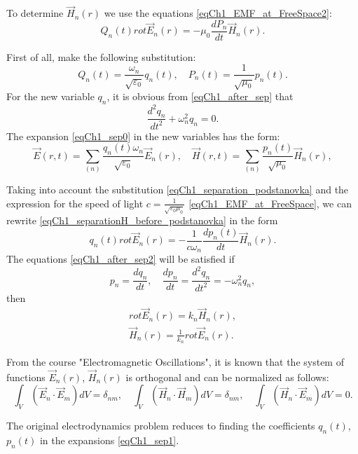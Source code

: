 To determine $\vec{H}_n\left(r\right)$ we use the equations 
\eqref{eqCh1_EMF_at_FreeSpace2}:
\begin{equation}
Q_n\left(t\right)  rot
\vec{E}_n\left(r\right) = -\mu_0 \frac{d P_n}{d t}
\vec{H}_n\left(r\right).
\label{eqCh1_separationH_before_podstanovka}
\end{equation}

First of all, make the following substitution:
\begin{equation}
Q_n\left(t\right) = \frac{\omega_n}{\sqrt{\varepsilon_0}}q_n\left(t\right),
\quad
P_n\left(t\right) = \frac{1}{\sqrt{\mu_0}}p_n\left(t\right).
\label{eqCh1_separation_podstanovka}
\end{equation}
For the new variable $q_n$, it is obvious from \eqref{eqCh1_after_sep} that
\[
\frac{d^2 q_n}{d t^2} + \omega_n^2 q_n = 0.
\]
The expansion \eqref{eqCh1_sep0} in the new variables has the form:
\begin{equation}
\vec{E}\left(r, t\right) = \sum_{(n)}
\frac{q_n\left(t\right) \omega_n}{\sqrt{\varepsilon_0}} \vec{E}_n\left(r\right),
\quad
\vec{H}\left(r, t\right) = \sum_{(n)}
\frac{p_n\left(t\right)}{\sqrt{\mu_0}} \vec{H}_n\left(r\right),
\label{eqCh1_sep1}
\end{equation}

Taking into account the substitution \eqref{eqCh1_separation_podstanovka} and the expression for the speed of light $c =   \frac{1}{\sqrt{\varepsilon_0 \mu_0}}$
\eqref{eqCh1_EMF_at_FreeSpace}, we can rewrite 
\eqref{eqCh1_separationH_before_podstanovka} in the form
\begin{equation}
q_n\left(t\right) rot \vec{E}_n\left(r\right) = - \frac{1}{c \omega_n}
\frac{d p_n\left(t\right)}{d t} \vec{H}_n\left(r\right).
\label{eqCh1_after_sep2}
\end{equation}
The equations \eqref{eqCh1_after_sep2} will be satisfied if  
\[
p_n = \frac{d q_n}{d t}, \quad \frac{d p_n}{d t} = 
\frac{d^2 q_n}{d t^2} = - \omega_n^2 q_n,
\]
then
\begin{eqnarray}
rot \vec{E}_n\left(r\right) = k_n \vec{H}_n\left(r\right),
\nonumber \\
\vec{H}_n\left(r\right) =  \frac{1}{k_n} rot \vec{E}_n\left(r\right).
\end{eqnarray}

From the course "Electromagnetic Oscillations", it is known that the system of functions  
$\vec{E}_n\left(r\right)$, $\vec{H}_n\left(r\right)$ is orthogonal and
can be normalized as follows: 
\begin{equation}
\int_{V} \left( \vec{E}_n \cdot \vec{E}_m \right) d V = \delta_{nm},
\quad
\int_{V} \left( \vec{H}_n \cdot \vec{H}_m \right) d V = \delta_{nm},
\quad
\int_{V} \left( \vec{H}_n \cdot \vec{E}_m \right) d V = 0.
\label{eqCh1_task1}
\end{equation}

The original electrodynamics problem reduces to finding the coefficients $q_n\left(t\right)$, $p_n\left(t\right)$
in the expansions \eqref{eqCh1_sep1}.